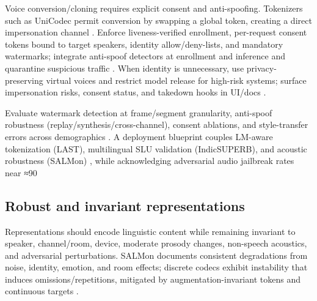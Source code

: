 Voice conversion/cloning requires explicit consent and anti-spoofing. Tokenizers such as UniCodec permit conversion by swapping a global token, creating a direct impersonation channel \cite{jiang2025universalspeechtokenlearninglowbitratene}. Enforce liveness-verified enrollment, per-request consent tokens bound to target speakers, identity allow/deny-lists, and mandatory watermarks; integrate anti-spoof detectors at enrollment and inference and quarantine suspicious traffic \cite{bai2025dmelspeechtokenizationmadesimple}. When identity is unnecessary, use privacy-preserving virtual voices and restrict model release for high-risk systems; surface impersonation risks, consent status, and takedown hooks in UI/docs \cite{zhao2024advancingspeechlanguagemodelsscalingsupe,park2025longformspeechgenerationspokenlanguagemo,gong2024seamlessexpressivelmspeechlanguagemodele}.

Evaluate watermark detection at frame/segment granularity, anti-spoof robustness (replay/synthesis/cross-channel), consent ablations, and style-transfer errors across demographics \cite{wang2025ssrspeechtowardsstablesaferobustzeroshot,bai2025dmelspeechtokenizationmadesimple,gong2024seamlessexpressivelmspeechlanguagemodele}. A deployment blueprint couples LM-aware tokenization (LAST), multilingual SLU validation (IndicSUPERB), and acoustic robustness (SALMon) \cite{turetzky2024lastlanguagemodelawarespeechtokenization,entry2025indicsuperbspeechprocessinguniversalperf,maimon2025salmonsuiteacousticlanguagemodelevaluati}, while acknowledging adversarial audio jailbreak rates near ≈90%

\subsection{Robust and invariant representations} \label{subsec:Robust and invariant representations}
Representations should encode linguistic content while remaining invariant to speaker, channel/room, device, moderate prosody changes, non-speech acoustics, and adversarial perturbations. SALMon documents consistent degradations from noise, identity, emotion, and room effects; discrete codecs exhibit instability that induces omissions/repetitions, mitigated by augmentation-invariant tokens and continuous targets \cite{maimon2025salmonsuiteacousticlanguagemodelevaluati,liu2024analyzingmitigatinginconsistencydiscrete,yuan2024continuousspeechtokensmakesllmsrobustmul,fily2024establishingdegreesclosenessbetweenaudio}.

